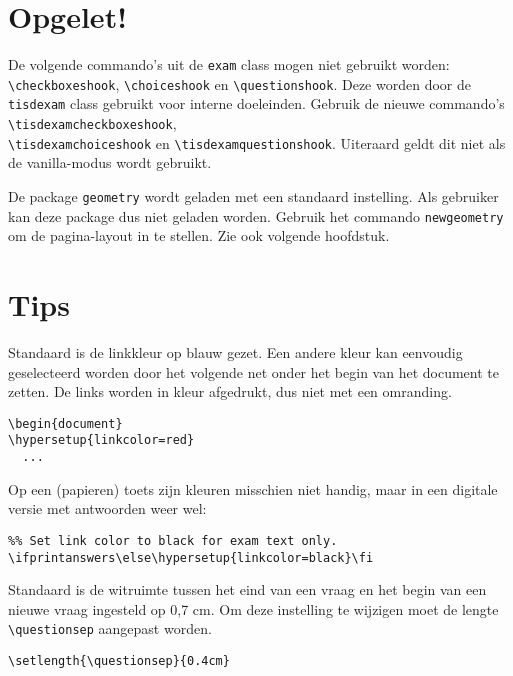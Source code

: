 \documentclass[dutch,a4paper,12pt,addpoints,fleqn,oneside]{tisdexam}
\newcommand\DocClass[1]{\texttt{#1}}
\begin{document}
\section{Opgelet!}
De volgende commando's uit de \DocClass{exam} class mogen niet gebruikt
worden: \verb|\checkboxeshook|, \verb|\choiceshook| en \verb|\questionshook|.
Deze worden door de \DocClass{tisdexam} class gebruikt voor interne doeleinden.
Gebruik de nieuwe commando's \verb|\tisdexamcheckboxeshook|, \\
\verb|\tisdexamchoiceshook| en \verb|\tisdexamquestionshook|. Uiteraard geldt
dit niet als de vanilla-modus wordt gebruikt.

\medskip
De package \verb|geometry| wordt geladen met een standaard instelling. Als
gebruiker kan deze package dus niet geladen worden. Gebruik het commando
\verb|newgeometry| om de pagina-layout in te stellen. Zie ook volgende
hoofdstuk.


\section{Tips}
Standaard is de linkkleur op blauw gezet. Een andere kleur kan eenvoudig
geselecteerd worden door het volgende net onder het begin van het document
te zetten. De links worden in kleur afgedrukt, dus niet met een omranding.

\begin{lstlisting}
\begin{document}
\hypersetup{linkcolor=red}
  ...
\end{lstlisting}

\medskip
Op een (papieren) toets zijn kleuren misschien niet handig, maar in een
digitale versie met antwoorden weer wel:

\begin{lstlisting}
%% Set link color to black for exam text only.
\ifprintanswers\else\hypersetup{linkcolor=black}\fi
\end{lstlisting}

\medskip
Standaard is de witruimte tussen het eind van een vraag en het begin van een
nieuwe vraag ingesteld op 0,7 cm. Om deze instelling te wijzigen moet de
lengte \verb|\questionsep| aangepast worden.

\begin{lstlisting}
\setlength{\questionsep}{0.4cm}
\end{lstlisting}
\end{document}
